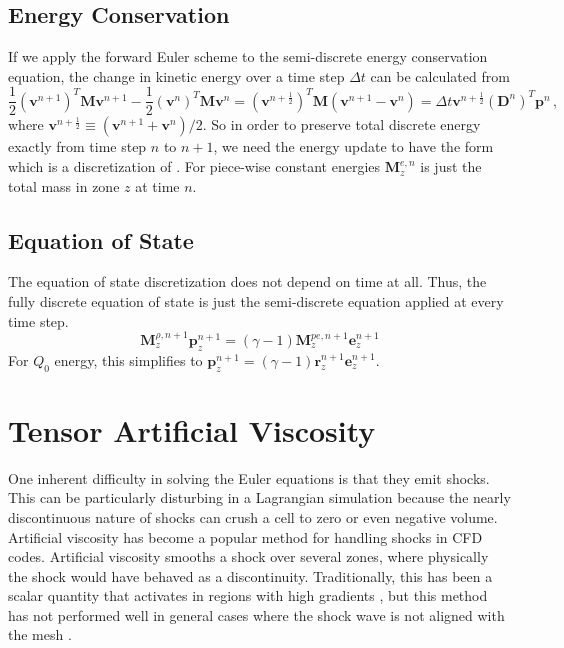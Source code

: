 \subsection{Energy Conservation}
If we apply the forward Euler scheme to the semi-discrete energy conservation equation, the change in kinetic energy over a time step $\Delta t$ can be calculated from 
$$
  \frac{1}{2} (\mathbf{v}^{n+1})^T \mathbf{M} \mathbf{v}^{n+1} -
  \frac{1}{2} (\mathbf{v}^{n})^T   \mathbf{M}   \mathbf{v}^{n} =
  (\mathbf{v}^{n+\frac{1}{2}})^T   \mathbf{M}(\mathbf{v}^{n+1} - \mathbf{v}^{n}) =
  \Delta t \mathbf{v}^{n+\frac{1}{2}}(\mathbf{D}^n)^T \mathbf{p}^n\,,
$$
where $\mathbf{v}^{n+\frac{1}{2}} \equiv (\mathbf{v}^{n+1} + \mathbf{v}^{n})/2$. So in order to preserve total discrete energy exactly from time step $n$ to $n+1$, we need the energy update to have the form
which is a discretization of .
For piece-wise constant energies $\mathbf{M}^{e,n}_z$ is just the total mass in zone $z$ at time $n$.

\subsection{Equation of State}
The equation of state discretization does not depend on time at all. Thus, the fully discrete equation of state is just the semi-discrete equation applied at every time step.
$$
\boxed{
\mathbf{M}^{\rho,n+1}_z \mathbf{p}^{n+1}_z =
(\gamma-1) \mathbf{M}^{p e, n+1}_z \mathbf{e}^{n+1}_z
}
$$
For $Q_0$ energy, this simplifies to $\mathbf{p}^{n+1}_z=(\gamma-1)\mathbf{r}^{n+1}_z \mathbf{e}^{n+1}_z$.

\section{Tensor Artificial Viscosity}
One inherent difficulty in solving the Euler equations is that they emit shocks. This can be particularly disturbing in a Lagrangian simulation because the nearly discontinuous nature of shocks can crush a cell to zero or even negative volume. Artificial viscosity has become a popular method for handling shocks in CFD codes. Artificial viscosity smooths a shock over several zones, where physically the shock would have behaved as a discontinuity. Traditionally, this has been a scalar quantity that activates in regions with high gradients \cite{VonNeumannRichtmyer50}, but this method has not performed well in general cases where the shock wave is not aligned with the mesh \cite{KolevRieben09}. 

